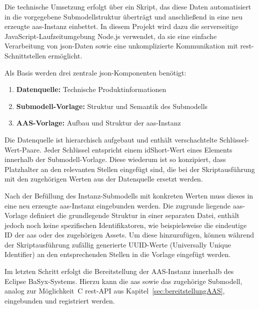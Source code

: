 Die technische Umsetzung erfolgt über ein Skript, das diese Daten automatisiert in die vorgegebene Submodellstruktur überträgt und anschließend in eine neu erzeugte \acs{aas}-Instanz einbettet.
In diesem Projekt wird dazu die serverseitige JavaScript-Laufzeitumgebung Node.js \cite{nodejs} verwendet, da sie eine einfache Verarbeitung von \acs{json}-Daten sowie eine unkomplizierte Kommunikation mit \acs{rest}-Schnittstellen ermöglicht. 

Als Basis werden drei zentrale \acs{json}-Komponenten benötigt:

\begin{enumerate}[noitemsep, leftmargin=*, label=\textbf{\arabic*.}]
    \item \textbf{Datenquelle:} Technische Produktinformationen
    \item \textbf{Submodell-Vorlage:} Struktur und Semantik des Submodells
    \item \textbf{AAS-Vorlage:} Aufbau und Struktur der \acs{aas}-Instanz
\end{enumerate}

Die Datenquelle ist hierarchisch aufgebaut und enthält verschachtelte Schlüssel-Wert-Paare. 
Jeder Schlüssel entspricht einem idShort-Wert eines Elements innerhalb der Submodell-Vorlage. 
Diese wiederum ist so konzipiert, dass Platzhalter an den relevanten Stellen eingefügt sind, die bei der Skriptausführung mit den zugehörigen Werten aus der Datenquelle ersetzt werden.

Nach der Befüllung des Instanz-Submodells mit konkreten Werten muss dieses in eine neu erzeugte \acs{aas}-Instanz eingebunden werden.
Die zugrunde liegende \acs{aas}-Vorlage definiert die grundlegende Struktur in einer separaten Datei, enthält jedoch noch keine spezifischen Identifikatoren, wie beispielsweise die eindeutige ID der \acs{aas} oder des zugehörigen Assets.
Um diese hinzuzufügen, können während der Skriptausführung zufällig generierte UUID-Werte (Universally Unique Identifier) an den entsprechenden Stellen in die Vorlage eingefügt werden.

Im letzten Schritt erfolgt die Bereitstellung der AAS-Instanz innerhalb des Eclipse BaSyx-Systems. 
Hierzu kann die \acs{aas} sowie das zugehörige Submodell, analog zur Möglichkeit~C \acs{rest}-API aus Kapitel~\ref{sec:bereitstellungAAS}, eingebunden und registriert werden.
